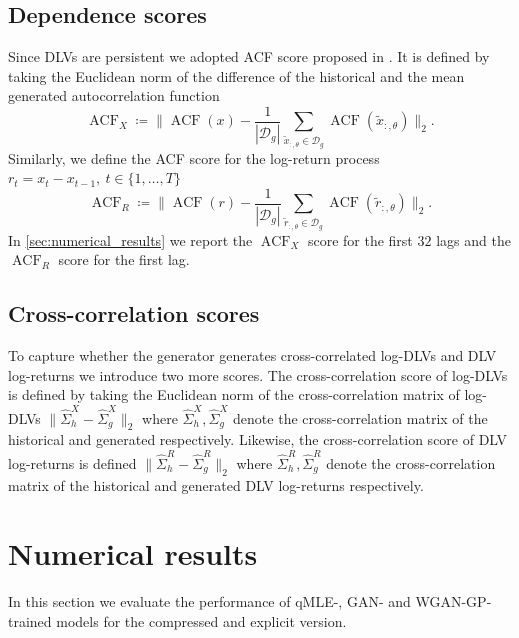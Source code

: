 \documentclass[]{article} %
\begin{document}
\subsection{Dependence scores}
Since DLVs are persistent we adopted ACF score proposed in \cite{Wiese2019}. It is defined by taking the Euclidean norm of the difference of the historical and the mean generated autocorrelation function
\[
\operatorname{ACF}_X \coloneqq 
\|
\operatorname{ACF}(x) - \frac{1}{|\mathcal{D}_g|}\sum_{\tilde x_{:, \theta} \in \mathcal{D}_g} \operatorname{ACF}(\tilde x_{:, \theta})
\|_2.
\]
Similarly, we define the ACF score for the log-return process $r_{t} = x_{t} - x_{t-1}, \ t \in \lbrace 1, \dots, T \rbrace$ 
\[
\operatorname{ACF}_R \coloneqq
\|
\operatorname{ACF}(r) - \frac{1}{|\mathcal{D}_g|}\sum_{\tilde r_{:, \theta} \in \mathcal{D}_g} \operatorname{ACF}(\tilde r_{:, \theta})
\|_2.
\] 
In \autoref{sec:numerical_results} we report the $\operatorname{ACF}_X$ score for the first $32$ lags and the $\operatorname{ACF}_R$ score for the first lag. 
\subsection{Cross-correlation scores}
To capture whether the generator generates cross-correlated log-DLVs and DLV log-returns we introduce two more scores. The cross-correlation score of log-DLVs is defined by taking the Euclidean norm of the cross-correlation matrix of log-DLVs ${\| \hat \Sigma_h^X - \hat \Sigma_g^X \|_2}$ where $\hat \Sigma^X_h, \hat \Sigma^X_g $ denote the cross-correlation matrix of the historical and generated respectively. Likewise, the cross-correlation score of DLV log-returns is defined ${\| \hat \Sigma_h^R - \hat \Sigma_g^R \|_2}$ where $\hat \Sigma^R_h, \hat \Sigma^R_g $ denote the cross-correlation matrix of the historical and generated DLV log-returns respectively.

\section{Numerical results}
\label{sec:numerical_results}
In this section we evaluate the performance of qMLE-, GAN- and WGAN-GP-trained models for the compressed and explicit version.
\end{document}
